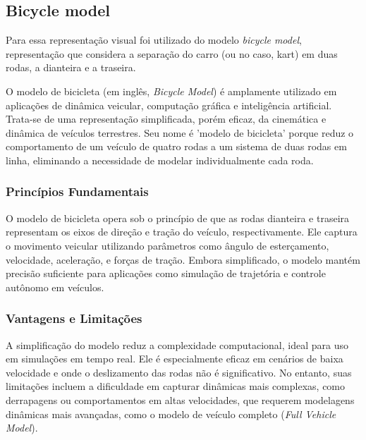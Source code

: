 \subsection{Bicycle model}

Para essa representação visual foi utilizado do modelo \textit{bicycle model}, representação que considera a separação do carro (ou no caso, kart) em duas rodas, a dianteira e a traseira.

O modelo de bicicleta (em inglês, \textit{Bicycle Model}) é amplamente utilizado em aplicações de dinâmica veicular, computação gráfica e inteligência artificial. Trata-se de uma representação simplificada, porém eficaz, da cinemática e dinâmica de veículos terrestres. Seu nome é 'modelo de bicicleta' porque reduz o comportamento de um veículo de quatro rodas a um sistema de duas rodas em linha, eliminando a necessidade de modelar individualmente cada roda.

\subsubsection{Princípios Fundamentais}

O modelo de bicicleta opera sob o princípio de que as rodas dianteira e traseira representam os eixos de direção e tração do veículo, respectivamente. Ele captura o movimento veicular utilizando parâmetros como ângulo de esterçamento, velocidade, aceleração, e forças de tração. Embora simplificado, o modelo mantém precisão suficiente para aplicações como simulação de trajetória e controle autônomo em veículos.

\subsubsection{Vantagens e Limitações}

A simplificação do modelo reduz a complexidade computacional, ideal para uso em simulações em tempo real. Ele é especialmente eficaz em cenários de baixa velocidade e onde o deslizamento das rodas não é significativo. No entanto, suas limitações incluem a dificuldade em capturar dinâmicas mais complexas, como derrapagens ou comportamentos em altas velocidades, que requerem modelagens dinâmicas mais avançadas, como o modelo de veículo completo (\textit{Full Vehicle Model}).

